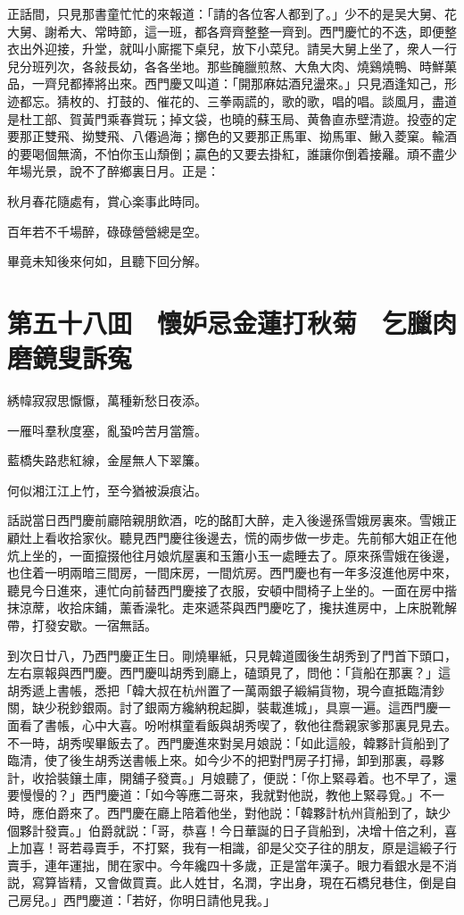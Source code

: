 正話間，只見那書童忙忙的來報道：「請的各位客人都到了。」少不的是吴大舅、花大舅、謝希大、常時節，這一班，都各齊齊整整一齊到。西門慶忙的不迭，即便整衣出外迎接，升堂，就叫小廝擺下桌兒，放下小菜兒。請吴大舅上坐了，衆人一行兒分班列次，各敍長幼，各各坐地。那些醃臘煎熬、大魚大肉、燒鷄燒鴨、時鮮菓品，一齊兒都捧將出來。西門慶又叫道：「開那麻姑酒兒盪來。」只見酒逢知己，形迹都忘。猜枚的、打鼓的、催花的、三拳兩謊的，歌的歌，唱的唱。談風月，盡道是杜工部、賀黃門乘春賞玩；掉文袋，也曉的蘇玉局、黄魯直赤壁清遊。投壺的定要那正雙飛、拗雙飛、八僊過海；擲色的又要那正馬軍、拗馬軍、鰍入菱窠。輸酒的要喝個無滴，不怕你玉山頹倒；贏色的又要去掛紅，誰讓你倒着接䍦。頑不盡少年場光景，說不了醉鄉裏日月。正是：

秋月春花隨處有，賞心楽事此時同。

百年若不千場醉，碌碌營營總是空。

畢竟未知後來何如，且聽下回分解。

\chapter*{第五十八囬　懷妒忌金蓮打秋菊　乞臘肉磨鏡叟訴寃}

綉幃寂寂思懨懨，萬種新愁日夜添。

一雁呌羣秋度塞，亂蛩吟苦月當簷。

藍橋失路悲紅線，金屋無人下翠簾。

何似湘江江上竹，至今猶被淚痕沾。

話説當日西門慶前廳陪親朋飲酒，吃的酩酊大醉，走入後邊孫雪娥房裏來。雪娥正顧灶上看收拾家伙。聽見西門慶往後邊去，慌的兩步做一步走。先前郁大姐正在他炕上坐的，一面攛掇他往月娘炕屋裏和玉簫小玉一處睡去了。原來孫雪娥在後邊，也住着一明兩暗三間房，一間床房，一間炕房。西門慶也有一年多沒進他房中來，聽見今日進來，連忙向前替西門慶接了衣服，安頓中間椅子上坐的。一面在房中揩抹涼蓆，收拾床鋪，薰香澡牝。走來遞茶與西門慶吃了，攙扶進房中，上床脱靴解帶，打發安歇。一宿無話。

到次日廿八，乃西門慶正生日。剛燒畢紙，只見韓道國後生胡秀到了門首下頭口，左右禀報與西門慶。西門慶叫胡秀到廳上，磕頭見了，問他：「貨船在那裏？」這胡秀遞上書帳，悉把「韓大叔在杭州置了一萬兩銀子緞絹貨物，現今直抵臨清鈔關，缺少税鈔銀兩。討了銀兩方纔納稅起脚，裝載進城」，具禀一遍。這西門慶一面看了書帳，心中大喜。吩咐棋童看飯與胡秀喫了，敎他往喬親家爹那裏見見去。不一時，胡秀喫畢飯去了。西門慶進來對吴月娘説：「如此這般，韓夥計貨船到了臨清，使了後生胡秀送書帳上來。如今少不的把對門房子打掃，卸到那裏，尋夥計，收拾裝鑲土庫，開舖子發賣。」月娘聽了，便説：「你上緊尋着。也不早了，還要慢慢的？」西門慶道：「如今等應二哥來，我就對他説，教他上緊尋覓。」不一時，應伯爵來了。西門慶在廳上陪着他坐，對他説：「韓夥計杭州貨船到了，缺少個夥計發賣。」伯爵就説：「哥，恭喜！今日華誕的日子貨船到，决增十倍之利，喜上加喜！哥若尋賣手，不打緊，我有一相識，卻是父交子往的朋友，原是這緞子行賣手，連年運拙，閒在家中。今年纔四十多歲，正是當年漢子。眼力看銀水是不消説，寫算皆精，又會做買賣。此人姓甘，名潤，字出身，現在石橋兒巷住，倒是自己房兒。」西門慶道：「若好，你明日請他見我。」

